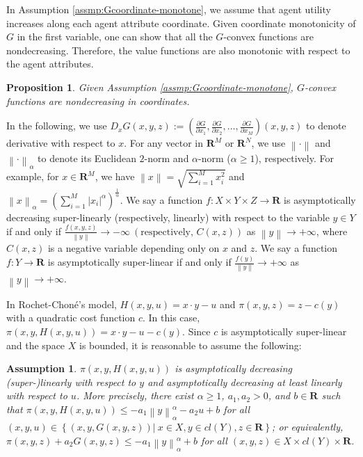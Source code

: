 \documentclass[a4paper, 11pt]{amsart}
\numberwithin{equation}{section}
\theoremstyle{plain}
\newtheorem{proposition}[theorem]{Proposition}
\newtheorem{assumption}{Assumption}
\theoremstyle{definition}
\theoremstyle{remark}
\newcommand{\R}{\mathbf{R}}
\newcommand{\norm}[1]{\left\lVert#1\right\rVert}
\begin{document}
In Assumption \ref{assmp:Gcoordinate-monotone}, we assume that agent utility increases along each agent attribute coordinate. Given coordinate monotonicity of $G$ in the first variable, one can show that all the $G$-convex functions are nondecreasing. Therefore, the value functions are also monotonic with respect to the agent attributes.\medskip

\begin{proposition}\label{nondecreasing}
	Given Assumption \ref{assmp:Gcoordinate-monotone}, $G$-convex functions are nondecreasing in coordinates.
\end{proposition}



 {In the following, we use  $D_x G(x,y,z) := \left(\frac{\partial G}{\partial x_1}, \frac{\partial G}{\partial x_2}, \dots, \frac{\partial G}{\partial x_M}\right)(x,y,z)$ to denote derivative with respect to $x$. For any vector in $\R^M$ or $\R^N$, we use $\norm{\cdot}$ and $\norm{\cdot}_{\alpha}$ to denote its Euclidean  $2$-norm and $\alpha$-norm ($\alpha \ge 1$), respectively. For example, for $x\in \R^M$, we have $\norm{x} = \sqrt{\sum_{i=1}^{M} x_i^2}$ and $\norm{x}_{\alpha} = \left(\sum_{i=1}^{M} |x_i|^{\alpha}\right)^{\frac{1}{\alpha}}$.} { We say a function $f: X \times Y \times Z \rightarrow \R$ is asymptotically decreasing super-linearly (respectively, linearly) with respect to the variable $y\in Y$ if and only if $\frac{f(x,y,z)}{\norm{y}} \rightarrow -\infty ~(\text{respectively, }C(x,z))$ as $\norm{y}\rightarrow +\infty$, where $C(x,z)$ is a negative variable depending only on $x$ and $z$. We say a function $f: Y\rightarrow \R$ is asymptotically super-linear if and only if $\frac{f(y)}{\norm{y}} \rightarrow +\infty$ as $\norm{y}\rightarrow +\infty$.}\medskip
 
In Rochet-Chon\'e's model, $H(x,y,u) = x\cdot y -u$ and $\pi(x,y,z) = z-c(y)$ with a quadratic cost function $c$. In this case, $\pi(x,y,H(x,y,u)) = x\cdot y -u -c(y)$. Since $c$ is asymptotically super-linear and the space $X$ is bounded, it is reasonable to assume the following:\medskip


	\begin{assumption}\label{assmp:Gtech0}
		$\pi(x,y,H(x,y,u))$ is {asymptotically decreasing (super-)linearly with respect to $y$ and  asymptotically decreasing at least linearly with respect to $u$}. More precisely, there exist $\alpha \ge 1$, $a_1, a_2> 0$, and $b\in \R$ such that $\pi(x,y,H(x,y,u)) \le -a_1 \norm{y}_{\alpha}^{\alpha} - a_2 u +b$ for all $ (x, y, u)\in \left\{ (x,y, G(x,y,z))|~ x\in X, y\in cl(Y), z\in \R \right\}$; or equivalently, $\pi(x,y,z) + a_2 G(x,y,z) \le -a_1 \norm{y}_{\alpha}^{\alpha}  +b$ for all $ (x, y, z)\in X\times cl(Y)\times \R$.
	\end{assumption}
	
\end{document}
